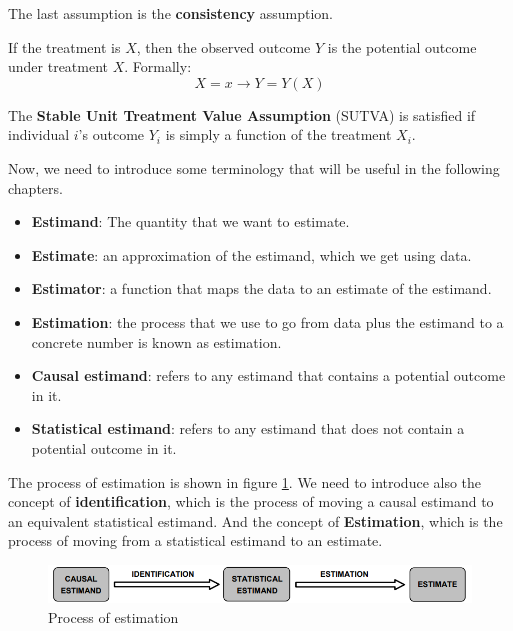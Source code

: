 The last assumption is the \textbf{consistency} assumption.
\begin{definition}[Consistency]
    If the treatment is $X$, then the observed outcome $Y$ is the potential outcome
    under treatment $X$. Formally:
    \begin{equation}
        X = x \rightarrow Y = Y(X)
    \end{equation}
\end{definition}

\begin{definition}
    The \textbf{Stable Unit Treatment Value Assumption} (SUTVA) is satisfied if
    individual $i$'s outcome $Y_i$ is simply a function of the treatment $X_i$.
\end{definition}

Now, we need to introduce some terminology that will be useful in the following
chapters.
\begin{itemize}
    \item \textbf{Estimand}: The quantity that we want to estimate.
    \item \textbf{Estimate}: an approximation of the estimand, which we get
          using data.
    \item \textbf{Estimator}: a function that maps the data to an estimate of the
          estimand.
    \item \textbf{Estimation}: the process that we use to go from data plus the
          estimand to a concrete number is known as estimation.
    \item \textbf{Causal estimand}: refers to any estimand that contains a potential
          outcome in it.
    \item \textbf{Statistical estimand}: refers to any estimand that does not contain
          a potential outcome in it.
\end{itemize}

The process of estimation is shown in figure \ref{fig:pipeline}. We need to
introduce also the concept of \textbf{identification}, which is the process of
moving a causal estimand to an equivalent statistical estimand. And the concept
of \textbf{Estimation}, which is the process of moving from a statistical estimand
to an estimate.
\begin{figure}[!ht]
    \centering
    \includegraphics[width=\textwidth]{img/process.png}
    \caption{Process of estimation}
    \label{fig:pipeline}
\end{figure}